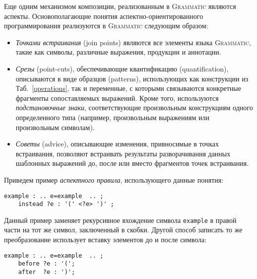 \documentclass[12pt,a4paper]{article}
\newcommand{\tabref}[1]{Таб.~\ref{#1}}
\newcommand{\term}[1]{\emph{#1}}
\newcommand{\code}[1]{\mbox{\texttt{#1}}}
\newcommand{\tool}[1]{\textsc{#1}}
\theoremstyle{definition}
\theoremstyle{plain}
\newcommand{\GRM}{\tool{Grammatic}}
\begin{document}
Еще одним механизмом композиции, реализованным в \GRM{} являются аспекты. 
Основополагающие понятия аспектно-ориентированного программирования реализуются в \GRM{} следующим образом:
\begin{itemize}
\item \term{Точками встраивания} (join points) являются все элементы языка \GRM{}, такие как символы, различные выражения, продукции и аннотации.
\item \term{Срезы} (point-cuts), обеспечивающие квантификацию (quantification), описываются в виде образцов (patterns), использующих как конструкции из \tabref{operations}, так и переменные, с которыми связываются конкретные фрагменты сопоставляемых выражений. Кроме того, используются \term{подстановочные знаки}, соответствующие произвольным конструкциям одного определенного типа (например, произвольным выражениям или произвольным символам).
\item \term{Советы} (advice), описывающие изменения, привносимые в точках встраивания, позволяют встраивать результаты разворачивания данных шаблонных выражений до, после или вместо фрагментов точек встраивания.
\end{itemize}
Приведем пример \term{аспектного правила}, использующего данные понятия:
\begin{lstlisting}
example : .. e=example  .. ;
	instead ?e : '(' <?e> ')' ;
\end{lstlisting}
Данный пример заменяет рекурсивное вхождение символа \code{example} в правой части на тот же символ, заключенный в скобки. Другой способ записать то же преобразование использует вставку элементов до и после символа:
\begin{lstlisting}
example : .. e=example  .. ;
	before ?e : '(';
	after  ?e : ')';
\end{lstlisting}
\end{document}
